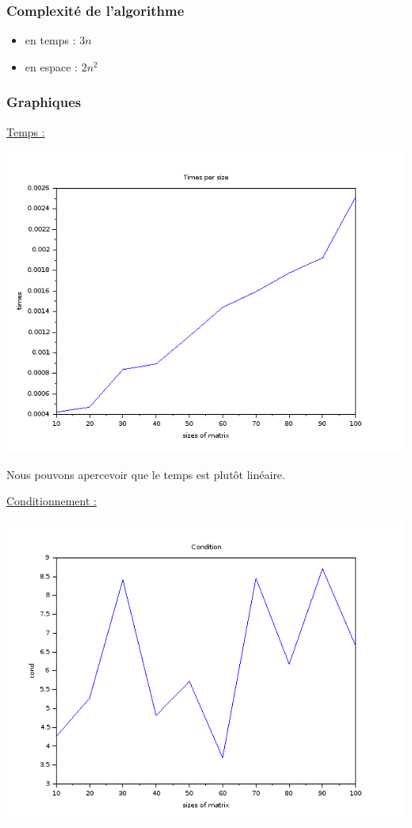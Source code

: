 \documentclass{article}
\begin{document}
\subsubsection*{Complexité de l'algorithme}

\begin{itemize}
\item en temps : $3n$
\item en espace : $2n^2$
\end{itemize}

\subsubsection*{Graphiques}

\underline{Temps :}

\includegraphics[scale=0.5]{img/lu_times.png}

Nous pouvons apercevoir que le temps est plutôt linéaire.\newline

\underline{Conditionnement :}

\includegraphics[scale=0.5]{img/lu_cond.png}
\end{document}
